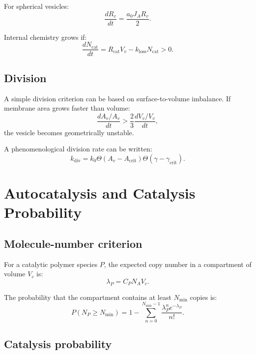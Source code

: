 \documentclass[11pt]{article}
\begin{document}
For spherical vesicles:
\begin{equation}
    \frac{dR_v}{dt}
    =
    \frac{a_0 J_A R_v}{2}.
\end{equation}

Internal chemistry grows if:
\begin{equation}
    \frac{dN_{\mathrm{cat}}}{dt}
    =
    R_{\mathrm{cat}} V_v
    -
    k_{\mathrm{loss}}N_{\mathrm{cat}}
    >
    0.
\end{equation}

\subsection{Division}

A simple division criterion can be based on surface-to-volume imbalance. If
membrane area grows faster than volume:
\begin{equation}
    \frac{dA_v/A_v}{dt}
    >
    \frac{2}{3}
    \frac{dV_v/V_v}{dt},
\end{equation}
the vesicle becomes geometrically unstable.

A phenomenological division rate can be written:
\begin{equation}
    k_{\mathrm{div}}
    =
    k_0
    \Theta(A_v-A_{\mathrm{crit}})
    \Theta(\gamma-\gamma_{\mathrm{crit}}).
\end{equation}

\section{Autocatalysis and Catalysis Probability}

\subsection{Molecule-number criterion}

For a catalytic polymer species $P$, the expected copy number in a compartment
of volume $V_c$ is:
\begin{equation}
    \lambda_P = C_P N_A V_c.
\end{equation}

The probability that the compartment contains at least $N_{\mathrm{min}}$
copies is:
\begin{equation}
    P(N_P \geq N_{\mathrm{min}})
    =
    1 -
    \sum_{n=0}^{N_{\mathrm{min}}-1}
    \frac{\lambda_P^n e^{-\lambda_P}}{n!}.
\end{equation}

\subsection{Catalysis probability}
\end{document}
